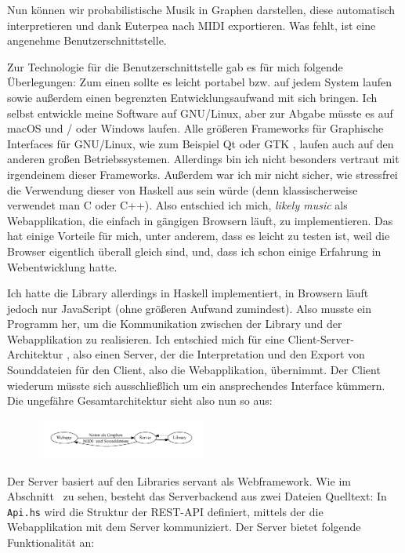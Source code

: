 \documentclass[a4paper,twocolumn]{article}
\begin{document}
Nun können wir probabilistische Musik in Graphen darstellen, diese automatisch
interpretieren und dank Euterpea nach MIDI exportieren. Was fehlt, ist eine
angenehme Benutzerschnittstelle.

Zur Technologie für die Benutzerschnittstelle gab es für mich folgende
Überlegungen: Zum einen sollte es leicht portabel bzw. auf jedem System laufen
sowie außerdem einen begrenzten Entwicklungsaufwand mit sich bringen.
Ich selbst entwickle meine Software auf
GNU/Linux, aber zur Abgabe müsste es auf macOS und / oder Windows laufen. Alle
größeren Frameworks für Graphische Interfaces für GNU/Linux, wie zum Beispiel Qt
\cite{qt} oder GTK \cite{gtk}, laufen auch auf den anderen großen
Betriebssystemen. Allerdings bin ich nicht besonders vertraut mit irgendeinem
dieser Frameworks. Außerdem war ich mir nicht sicher, wie stressfrei die
Verwendung dieser von Haskell aus sein würde (denn klassischerweise verwendet
man C oder C++). Also entschied ich mich, {\it likely music} als Webapplikation,
die einfach in gängigen Browsern läuft, zu implementieren. Das hat einige
Vorteile für mich, unter anderem, dass es leicht zu testen ist, weil die Browser
eigentlich überall gleich sind, und, dass ich schon einige Erfahrung in
Webentwicklung hatte.

Ich hatte die Library allerdings in Haskell implementiert, in Browsern
läuft jedoch nur JavaScript (ohne größeren Aufwand zumindest). Also musste
ein Programm her, um die Kommunikation zwischen der Library und der
Webapplikation zu realisieren. Ich entschied mich für eine
Client-Server-Architektur \cite{wikipedia_client_server}, also einen Server, der
die Interpretation und den Export von Sounddateien für den Client, also die
Webapplikation, übernimmt. Der Client wiederum müsste sich ausschließlich um ein
ansprechendes Interface kümmern. Die ungefähre Gesamtarchitektur sieht also nun
so aus:

\begin{figure}[h]
  \includegraphics[width=0.5\textwidth]{architektur}
\end{figure}

Der Server basiert auf den Libraries servant \cite{servant} als Webframework.
Wie im Abschnitt~ zu sehen, besteht das Serverbackend aus
zwei Dateien Quelltext: In \lstinline|Api.hs| wird die
Struktur der REST-API \cite{wikipedia_rest} definiert, mittels der die
Webapplikation mit dem Server kommuniziert. Der Server bietet folgende Funktionalität
an:
\end{document}
